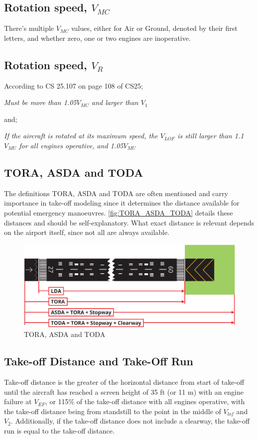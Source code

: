 \subsection{Rotation speed, $V_{MC}$}
There's multiple $V_{MC}$ values, either for Air or Ground, denoted by their first letters, and whether zero, one or two engines are inoperative.

\subsection{Rotation speed, $V_R$}
According to CS 25.107 on page 108 of CS25;
\begin{center}
    \textit{Must be more than 1.05$V_{MC}$ and larger than $V_1$}
\end{center}
and;
\begin{center}
    \textit{If the aircraft is rotated at its maximum speed, the $V_{LOF}$ is still larger than 1.1$V_{MU}$ for all engines operative, and 1.05$V_{MU}$}
\end{center}

\subsection{TORA, ASDA and TODA}
The definitions TORA, ASDA and TODA are often mentioned and carry importance in take-off modeling since it determines the distance available for potential emergency manoeuvres. \autoref{fig:TORA_ASDA_TODA} details these distances and should be self-explanatory. What exact distance is relevant depends on the airport itself, since not all are always available.

\begin{figure}
    \centering
    \includegraphics[width=0.75\linewidth]{figures/TORA_ASDA_TODA.jpg}
    \caption{TORA, ASDA and TODA}
    \label{fig:TORA_ASDA_TODA}
\end{figure}

\subsection{Take-off Distance and Take-Off Run}
Take-off distance is the greater of the horizontal distance from start of take-off until the aircraft has reached a screen height of 35 ft (or 11 m) with an engine failure at $V_{EF}$, or 115\% of the take-off distance with all engines operative, with the take-off distance being from standstill to the point in the middle of $V_{lof}$ and $V_2$. Additionally, if the take-off distance does not include a clearway, the take-off run is equal to the take-off distance.

